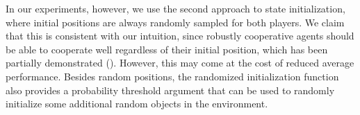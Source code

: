 In our experiments, however, we use the second approach to state initialization, where initial positions are always randomly sampled for both players.
We claim that this is consistent with our intuition, since robustly cooperative agents should be able to cooperate well regardless of their initial position, which has been partially demonstrated (\cite{knott2021evaluating}).
However, this may come at the cost of reduced average performance.
Besides random positions, the randomized initialization function also provides a probability threshold argument that can be used to randomly initialize some additional random objects in the environment.
